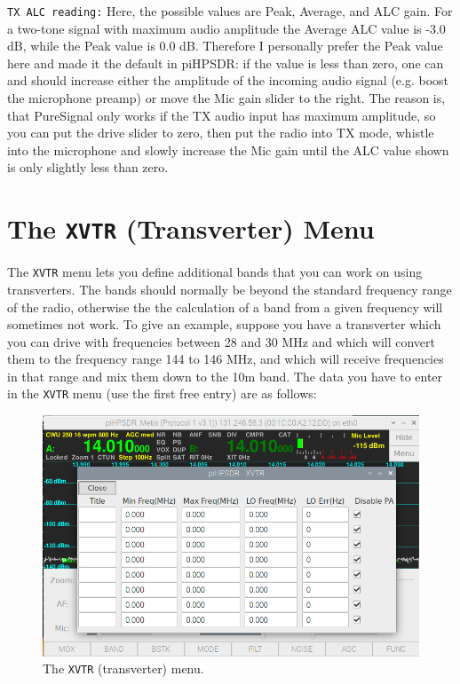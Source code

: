 \documentclass[12pt]{book}
\def\rett#1{\texttt{\color{red}#1}}
\def\bltt#1{\texttt{\color{blue}#1}}
\begin{document}
\rett{TX ALC reading:} Here, the possible values are Peak, Average, and
ALC gain. For a two-tone signal with maximum audio amplitude the Average
ALC value is -3.0 dB, while the Peak value is 0.0 dB. Therefore I personally
prefer the Peak value here and made it the default in piHPSDR:
 if the value is less than zero, one can and should
increase either the amplitude of the incoming audio signal (e.g. boost the
microphone preamp) or move the Mic gain slider to the right. The reason is,
that PureSignal only works if the TX audio input has maximum amplitude,
so you can put the drive slider to zero, then put the radio into TX mode,
whistle into the microphone and slowly increase the Mic gain until the
ALC value shown is only slightly less than zero.


\section{The \texttt{XVTR} (Transverter) Menu}

The \bltt{XVTR} menu lets you define additional bands 
that you can work on using transverters. The bands
should normally be beyond the standard frequency range of
the radio, otherwise the the calculation of a band from
a given frequency will sometimes not work. To give an example,
suppose you have a transverter which you can drive with frequencies
between 28 and 30 MHz and which will convert them to the frequency
range 144 to 146 MHz, and which will receive frequencies in that
range and mix them down to the 10m band. The data you have to enter
in the \bltt{XVTR} menu (use the first free entry) are as follows:
\begin{figure}[h]
\center
\includegraphics[width=12cm]{XVTRMenu.png}
\caption{The \bltt{XVTR} (transverter) menu.}
\label{fig:XVTRMenu}
\end{figure}
\end{document}
